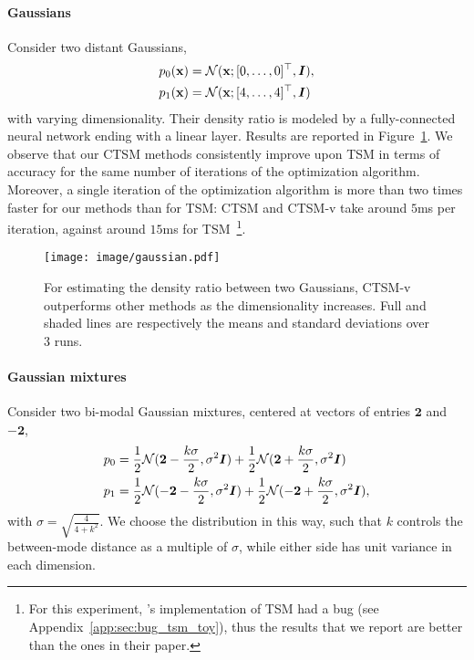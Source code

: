\paragraph{Gaussians} 
Consider two distant Gaussians,
\begin{align}
    p_0(\operatorname{\mathbf{x}}) 
    &= 
    \mathcal{N}(\operatorname{\mathbf{x}}; [0, \ldots, 0]^\top,  {\bm{I}}),
    \\
    p_1(\operatorname{\mathbf{x}}) 
    &= 
    \mathcal{N}(\operatorname{\mathbf{x}}; [4, \ldots, 4]^\top, {\bm{I}})
\end{align}
with varying dimensionality. Their density ratio is modeled by a fully-connected neural network ending with a linear layer. Results are reported in Figure~\ref{fig:gaussians}. We observe that our CTSM methods consistently improve upon TSM in terms of accuracy for the same number of iterations of the optimization algorithm. Moreover, a single iteration of the optimization algorithm is more than two times faster for our methods than for TSM: CTSM and CTSM-v take around $5$ms per iteration, against around $15$ms for TSM~\footnote{For this experiment, \citet{choi2022densityratio}'s implementation of TSM had a bug (see Appendix~\ref{app:sec:bug_tsm_toy}), thus the results that we report are better than the ones in their paper.}.

\begin{figure}[ht]
\begin{center}
\texttt{[image: image/gaussian.pdf]}
\caption{
For estimating the density ratio between two Gaussians, CTSM-v outperforms other methods as the dimensionality increases. Full and shaded lines are respectively the means and standard deviations over $3$ runs. 
}
\label{fig:gaussians}
\end{center}
\end{figure}

\paragraph{Gaussian mixtures}
Consider two bi-modal Gaussian mixtures, centered at vectors of entries $\mathbf{2}$ and $\mathbf{-2}$,
\begin{align}
    p_0 
    &= 
    \frac{1}{2} 
    \mathcal{N}(\mathbf{2} - \frac{k\sigma}{2}, \sigma^{2}{\bm{I}})
    +
    \frac{1}{2} 
    \mathcal{N}(\mathbf{2} + \frac{k\sigma}{2}, \sigma^{2}{\bm{I}})
    \\
    p_1 
    &= 
    \frac{1}{2} 
    \mathcal{N}(-\mathbf{2} - \frac{k\sigma}{2}, \sigma^{2}{\bm{I}})
    +
    \frac{1}{2} 
    \mathcal{N}(-\mathbf{2} + \frac{k\sigma}{2}, \sigma^{2}{\bm{I}}),
\end{align}
with $\sigma=\sqrt{\frac{4}{4+k^{2}}}$. We choose the distribution in this way, such that $k$ controls the between-mode distance as a multiple of $\sigma$, while either side has unit variance in each dimension.

